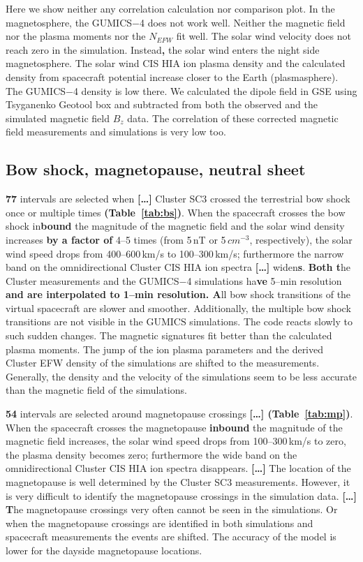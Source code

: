 \documentclass[linenumbers,draft]{agujournal}
\begin{document}
Here we show neither any correlation calculation nor comparison plot. In the magnetosphere, the GUMICS$-$4 does not work well. Neither the magnetic field nor the plasma moments nor the $N_{EFW}$ fit well. The solar wind velocity does not reach zero in the simulation. Instead\textbf{,} the solar wind enters the night side magnetosphere. The solar wind CIS HIA ion plasma density and the calculated density from spacecraft potential increase closer to the Earth (plasmasphere). The GUMICS$-$4 density is low there. We calculated the dipole field in GSE using Tsyganenko Geotool box \citep{tsyganenko95:_model_earth} and subtracted from both the observed and the simulated magnetic field $B_z$ data. The correlation of these corrected magnetic field measurements and simulations is very low too. 

\subsection{Bow shock, magnetopause, neutral sheet}
\label{sec:bs}

\textbf{77} intervals are selected when \textbf{[\dots]} Cluster SC3 crossed the terrestrial bow shock once or multiple times \textbf{(Table~\ref{tab:bs})}. When the spacecraft crosses the bow shock in\textbf{bound} the magnitude of the magnetic field and the solar wind density increases \textbf{by a factor of} 4--5 times (from 5\,nT or 5\,$cm^{-3}$, respectively), the solar wind speed drops from 400--600\,km/s to 100--300\,km/s; furthermore the narrow band on the omnidirectional Cluster CIS HIA ion spectra \textbf{[\dots]} widen\textbf{s}. \textbf{Both t}he Cluster measurements and the GUMICS$-$4 simulations ha\textbf{ve} 5--min resolution\textbf{ and are interpolated to 1--min resolution. A}ll bow shock transitions of the virtual spacecraft are slower and smoother. Additionally, the multiple bow shock transitions are not visible in the $\mathrm{GUMICS}$ simulations. The code reacts slowly to such sudden changes. The magnetic signatures fit better than the calculated plasma moments. The jump of the ion plasma parameters and the derived Cluster EFW density of the simulations are shifted to the measurements. Generally, the density and the velocity of the simulations seem to be less accurate than the magnetic field of the simulations.

\textbf{54} intervals are selected around magnetopause crossings \textbf{[\dots] (Table~\ref{tab:mp})}. When the spacecraft crosses the magnetopause \textbf{inbound} the magnitude of the magnetic field increases, the solar wind speed drops from 100--300\,km/s to zero, the plasma density becomes zero; furthermore the wide band on the omnidirectional Cluster CIS HIA ion spectra disappears. \textbf{[\dots]} The location of the magnetopause is well determined by the Cluster SC3 measurements. However, it is very difficult to identify the magnetopause crossings in the simulation data. \textbf{[\dots] T}he magnetopause crossings very often cannot be seen in the simulations. Or when the magnetopause crossings are identified in both simulations and spacecraft measurements the events are shifted. The accuracy of the model is lower for the dayside magnetopause locations. 
\end{document}
